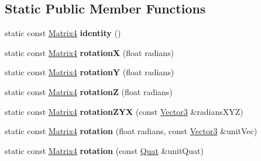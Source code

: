\subsection*{Static Public Member Functions}
\begin{DoxyCompactItemize}
\item 
\hypertarget{class_vectormath_1_1_aos_1_1_matrix4_aa659272cb0a315edf33d555d47f77af3}{static const \hyperlink{class_vectormath_1_1_aos_1_1_matrix4}{Matrix4} {\bfseries identity} ()}\label{class_vectormath_1_1_aos_1_1_matrix4_aa659272cb0a315edf33d555d47f77af3}

\item 
\hypertarget{class_vectormath_1_1_aos_1_1_matrix4_a91a927604ade04a7f3017a52b72a383e}{static const \hyperlink{class_vectormath_1_1_aos_1_1_matrix4}{Matrix4} {\bfseries rotation\+X} (float radians)}\label{class_vectormath_1_1_aos_1_1_matrix4_a91a927604ade04a7f3017a52b72a383e}

\item 
\hypertarget{class_vectormath_1_1_aos_1_1_matrix4_a8ff703dd45a1dc4ad90e144289d3b9fa}{static const \hyperlink{class_vectormath_1_1_aos_1_1_matrix4}{Matrix4} {\bfseries rotation\+Y} (float radians)}\label{class_vectormath_1_1_aos_1_1_matrix4_a8ff703dd45a1dc4ad90e144289d3b9fa}

\item 
\hypertarget{class_vectormath_1_1_aos_1_1_matrix4_a720bd6019bd6cc5e7afc35c248c168be}{static const \hyperlink{class_vectormath_1_1_aos_1_1_matrix4}{Matrix4} {\bfseries rotation\+Z} (float radians)}\label{class_vectormath_1_1_aos_1_1_matrix4_a720bd6019bd6cc5e7afc35c248c168be}

\item 
\hypertarget{class_vectormath_1_1_aos_1_1_matrix4_a1245260423ddc440d5936888c391b478}{static const \hyperlink{class_vectormath_1_1_aos_1_1_matrix4}{Matrix4} {\bfseries rotation\+Z\+Y\+X} (const \hyperlink{class_vectormath_1_1_aos_1_1_vector3}{Vector3} \&radians\+X\+Y\+Z)}\label{class_vectormath_1_1_aos_1_1_matrix4_a1245260423ddc440d5936888c391b478}

\item 
\hypertarget{class_vectormath_1_1_aos_1_1_matrix4_ad84115812d4267841fefccf93aed4630}{static const \hyperlink{class_vectormath_1_1_aos_1_1_matrix4}{Matrix4} {\bfseries rotation} (float radians, const \hyperlink{class_vectormath_1_1_aos_1_1_vector3}{Vector3} \&unit\+Vec)}\label{class_vectormath_1_1_aos_1_1_matrix4_ad84115812d4267841fefccf93aed4630}

\item 
\hypertarget{class_vectormath_1_1_aos_1_1_matrix4_a5db9f047ae5d50eec996ef40337871b4}{static const \hyperlink{class_vectormath_1_1_aos_1_1_matrix4}{Matrix4} {\bfseries rotation} (const \hyperlink{class_vectormath_1_1_aos_1_1_quat}{Quat} \&unit\+Quat)}\label{class_vectormath_1_1_aos_1_1_matrix4_a5db9f047ae5d50eec996ef40337871b4}


\end{DoxyCompactItemize}
